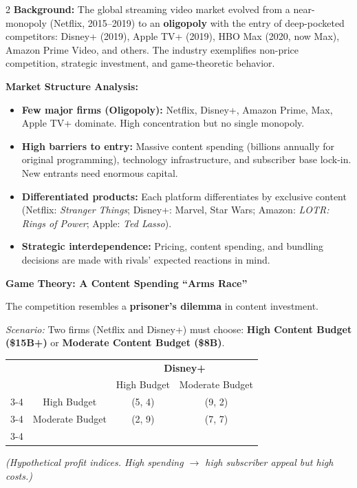 \documentclass[10pt,a4paper]{article}
\begin{document}
\begin{multicols}{2}
\textbf{Background:} The global streaming video market evolved from a near-monopoly (Netflix, 2015--2019) to an \textbf{oligopoly} with the entry of deep-pocketed competitors: Disney+ (2019), Apple TV+ (2019), HBO Max (2020, now Max), Amazon Prime Video, and others. The industry exemplifies non-price competition, strategic investment, and game-theoretic behavior.

\textbf{Market Structure Analysis:}
\begin{itemize}[leftmargin=*,nosep]
    \item \textbf{Few major firms (Oligopoly):} Netflix, Disney+, Amazon Prime, Max, Apple TV+ dominate. High concentration but no single monopoly.
    \item \textbf{High barriers to entry:} Massive content spending (billions annually for original programming), technology infrastructure, and subscriber base lock-in. New entrants need enormous capital.
    \item \textbf{Differentiated products:} Each platform differentiates by exclusive content (Netflix: \textit{Stranger Things}; Disney+: Marvel, Star Wars; Amazon: \textit{LOTR: Rings of Power}; Apple: \textit{Ted Lasso}).
    \item \textbf{Strategic interdependence:} Pricing, content spending, and bundling decisions are made with rivals' expected reactions in mind.
\end{itemize}

\textbf{Game Theory: A Content Spending ``Arms Race''}

The competition resembles a \textbf{prisoner's dilemma} in content investment.

\textit{Scenario:} Two firms (Netflix and Disney+) must choose: \textbf{High Content Budget (\$15B+)} or \textbf{Moderate Content Budget (\$8B)}.

\begin{center}
\begin{tabular}{cc|c|c|}
\multicolumn{2}{c}{} & \multicolumn{2}{c}{\textbf{Disney+}} \\
\multicolumn{2}{c}{} & High Budget & Moderate Budget \\
\cline{3-4}
\multirow{2}{*}{\textbf{Netflix}} & High Budget & (5, 4) & (9, 2) \\
\cline{3-4}
& Moderate Budget & (2, 9) & (7, 7) \\
\cline{3-4}
\end{tabular}
\end{center}
\textit{(Hypothetical profit indices. High spending $\to$ high subscriber appeal but high costs.)}


\end{multicols}
\end{document}
